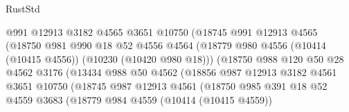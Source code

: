 \begin{lexlean}{RustStd}
\begin{coremodule}
                                  @991
                                  @12913
                                  @3182
                                  @4565
                                  @3651
                                  @10750
                                  (@18745
                                    @991
                                    @12913
                                    @4565
                                    (@18750
                                      @981
                                      @990
                                      @18
                                      @52
                                      @4556
                                      @4564
                                      (@18779
                                        @980
                                        @4556
                                        (@10414 (@10415 @4556))
                                        (@10230 (@10420 @980 @18)))
                                      (@18750
                                        @988
                                        @120
                                        @50
                                        @28
                                        @4562
                                        @3176
                                        (@13434
                                          @988
                                          @50
                                          @4562
                                          (@18856
                                            @987
                                            @12913
                                            @3182
                                            @4561
                                            @3651
                                            @10750
                                            (@18745
                                              @987
                                              @12913
                                              @4561
                                              (@18750
                                                @985
                                                @391
                                                @18
                                                @52
                                                @4559
                                                @3683
                                                (@18779
                                                  @984
                                                  @4559
                                                  (@10414 (@10415 @4559))

\end{coremodule}
\end{lexlean}
